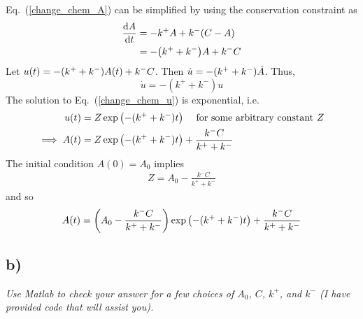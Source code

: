 \documentclass[12pt]{article}
\begin{document}
Eq.~(\ref{change_chem_A}) can be simplified by using the conservation constraint as
\begin{align*}
	\frac{\dd A}{\dd t} &= -k^+ A + k^- \qty(C - A) \\
	&= -\qty(k^+ + k^-)A + k^-C
\end{align*}
Let $u(t) = -\qty(k^+ + k^-)A(t) + k^-C$.  Then $\dot{u} = -\qty(k^+ + k^-)\dot{A}$.  Thus,
\begin{equation}
	\label{change_chem_u}
	\dot{u} = -(k^+ + k^-)u
\end{equation}
The solution to Eq.~(\ref{change_chem_u}) is exponential, i.e.
\begin{align*}
	u(t) &= Z\exp\qty(-(k^+ + k^-)t)\ \ \ \ \text{for some arbitrary constant $Z$} \\
	\implies A(t) &= Z\exp\qty(-(k^+ + k^-)t) + \frac{k^-C}{k^+ + k^-}
\end{align*}
The initial condition $A(0) = A_0$ implies
\begin{align*}
	Z = A_0 - \frac{k^-C}{k^+ + k^-}
\end{align*}
and so
\begin{equation}
	\label{chem_solution}
	A(t) = \qty(A_0 - \frac{k^-C}{k^+ + k^-})\exp\qty(-(k^+ + k^-)t) + \frac{k^-C}{k^+ + k^-}
\end{equation}

\subsection*{ b)}
{\it Use Matlab to check your answer for a few choices of $A_0$, $C$, $k^+$, and $k^-$ (I have provided code that will assist you).}
\end{document}
